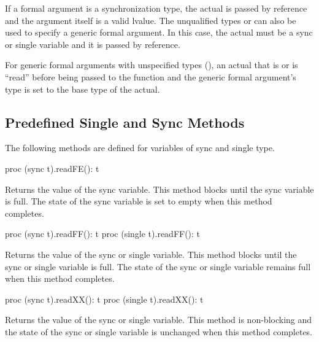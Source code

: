 If a formal argument is a synchronization type, the actual is passed
by reference and the argument itself is a valid lvalue.  The
unqualified types  or  can also be used to
specify a generic formal argument.  In this case, the actual must be a
sync or single variable and it is passed by reference.

For generic formal arguments with unspecified types
(), an actual that
is  or  is ``read'' before being passed to the
function and the generic formal argument's type is set to the base
type of the actual.


\subsection{Predefined Single and Sync Methods}
\label{Functions_on_Synchronization_Variables}

The following methods are defined for variables of sync and single
type.

\begin{protohead}
proc (sync t).readFE(): t
\end{protohead}
\begin{protobody}
Returns the value of the sync variable.  This method blocks until the
sync variable is full.  The state of the sync variable is set to empty
when this method completes.
\end{protobody}

\begin{protohead}
proc (sync t).readFF(): t
proc (single t).readFF(): t
\end{protohead}
\begin{protobody}
Returns the value of the sync or single variable.  This method blocks
until the sync or single variable is full.  The state of the sync or
single variable remains full when this method completes.
\end{protobody}

\begin{protohead}
proc (sync t).readXX(): t
proc (single t).readXX(): t
\end{protohead}
\begin{protobody}
Returns the value of the sync or single variable.  This method is non-blocking
and the state of the sync or single variable is unchanged when this method
completes.
\end{protobody}

